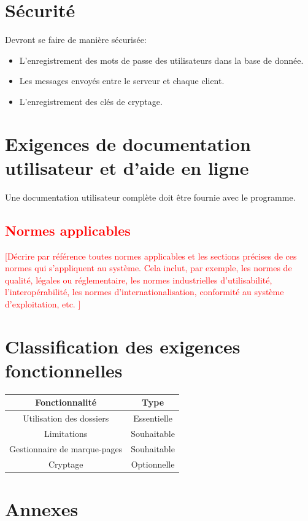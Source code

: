 \documentclass[10pt,a4paper]{report}
\begin{document}
\section{Sécurité}
Devront se faire de manière sécurisée:
\begin{itemize}
\item L'enregistrement des mots de passe des utilisateurs dans la base de donnée.
\item Les messages envoyés entre le serveur et chaque client.
\item L'enregistrement des clés de cryptage.
\end{itemize}



\section{Exigences de documentation utilisateur et d’aide en ligne}
Une documentation utilisateur complète doit être fournie avec le programme.


\textcolor{red}{\section{Normes applicables}
[Décrire par référence toutes normes applicables et les sections précises de ces normes qui s’appliquent au système. Cela inclut, par exemple, les normes de qualité, légales ou réglementaire, les normes industrielles d’utilisabilité, l’interopérabilité, les normes d’internationalisation, conformité au système d’exploitation, etc. ]}


\section{Classification des exigences fonctionnelles}
\bgroup
\def\arraystretch{1.5}
\begin{tabular}{|c|c|}
	\hline
	{\large \textbf{Fonctionnalité}} & {\large \textbf{Type}}\\
	\hline
	Utilisation des dossiers & Essentielle\\
	\hline
	Limitations & Souhaitable\\
	\hline
	Gestionnaire de marque-pages & Souhaitable\\
	\hline
	Cryptage & Optionnelle\\
	\hline
\end{tabular}
\egroup


\section{Annexes}
\end{document}
